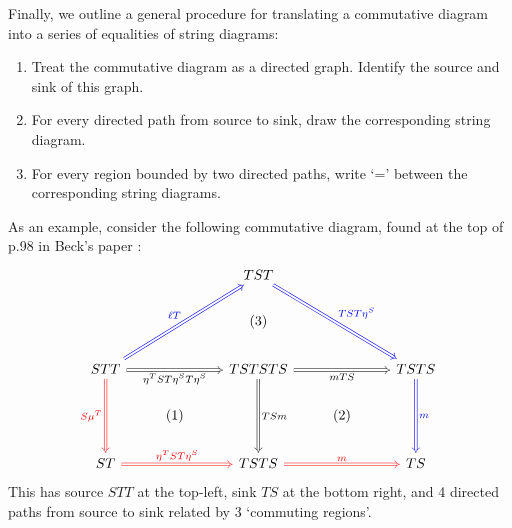 \documentclass{article}
\numberwithin{equation}{section}
\theoremstyle{definition}
\begin{document}
	Finally, we outline a general procedure for translating a commutative diagram into a series of equalities of string diagrams:
	\begin{enumerate}
		\item Treat the commutative diagram as a directed graph. Identify the source and sink of this graph.
		\item For every directed path from source to sink, draw the corresponding string diagram.
		\item For every region bounded by two directed paths, write `=' between the corresponding string diagrams.
	\end{enumerate}
	As an example, consider the following commutative diagram, found at the top of p.98 in Beck's paper \cite{beck1969distributive}:
	\begin{equation}
		\begin{tikzcd}
					& & TST  \ar[ddrr, "TST\eta^S", blue, Rightarrow]	& &
			\\
					& & (3)	& &
			\\
			STT \ar[uurr,"\ell T", blue, Rightarrow] \ar[rr, "\eta^T ST \eta^S T \eta^S"', Rightarrow] \ar[dd,"S \mu^T"' ,red, Rightarrow]	& & TSTSTS \ar[rr, "mTS"', Rightarrow] \ar[dd, "TSm", Rightarrow]	& & TSTS \ar[dd, "m", blue, Rightarrow]
			\\
				& (1) & & (2) &
			\\
			ST  \ar[rr, "\eta^T ST \eta^S", red, Rightarrow]	 & & TSTS 	\ar[rr, "m", red, Rightarrow]	& & TS
		\end{tikzcd}
	\end{equation}
	This has source $STT$ at the top-left, sink $TS$ at the bottom right, and 4 directed paths from source to sink related by 3 `commuting regions'. 
\end{document}
